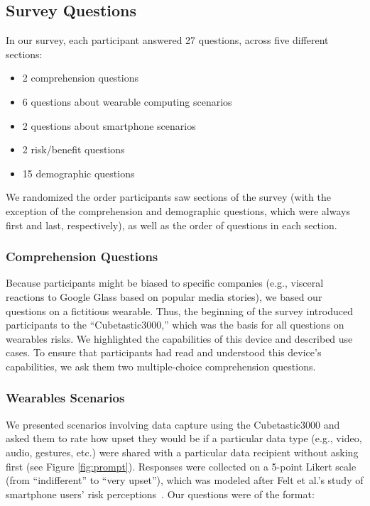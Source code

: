 \subsection{Survey Questions}
In our survey, each participant answered 27 questions, across five different sections:   \\[-.8cm]

\begin{itemize} \itemsep1pt \parskip0pt 
\item 2 comprehension questions
\item 6 questions about wearable computing scenarios 
\item 2 questions about smartphone scenarios 
\item 2 risk/benefit questions 
\item 15 demographic questions \\[-.8cm]
\end{itemize}

We randomized the order participants saw sections of the survey (with the exception of the comprehension and demographic questions, which were always first and last, respectively), as well as the order of questions in each section.

\subsubsection{Comprehension Questions}
Because participants might be biased to specific companies (e.g., visceral reactions to Google Glass based on popular media stories), we based our questions on a fictitious wearable. Thus, the beginning of the survey introduced participants to the ``Cubetastic3000,'' which was the basis for all questions on wearables risks. We highlighted the capabilities of this device and described use cases. To ensure that participants had read and understood this device's capabilities, we ask them two multiple-choice comprehension questions.

\subsubsection{Wearables Scenarios}
We presented scenarios involving data capture using the Cubetastic3000 and asked them to rate how upset they would be if a particular data type (e.g., video, audio, gestures, etc.) were shared with a particular data recipient without asking first (see Figure \ref{fig:prompt}). Responses were collected on a 5-point Likert scale (from ``indifferent'' to ``very upset''), which was modeled after Felt et al.'s study of smartphone users' risk perceptions~\cite{Felt}. Our questions were of the format: 

